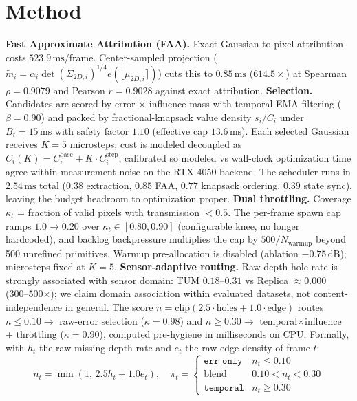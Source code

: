 \documentclass[10pt,twocolumn,letterpaper]{article}
\begin{document}
\section{Method}
\textbf{Fast Approximate Attribution (FAA).}
Exact Gaussian-to-pixel attribution costs $523.9\,\mathrm{ms}$/frame.
Center-sampled projection ($\tilde{m}_i = \alpha_i \det(\Sigma_{2D,i})^{1/4} e(\lfloor \mu_{2D,i} \rceil)$) cuts this to $\mathbf{0.85\,\mathrm{ms}}$ ($614.5\times$) at Spearman $\rho = 0.9079$ and Pearson $r = 0.9028$ against exact attribution.
\textbf{Selection.}
Candidates are scored by error $\times$ influence mass with temporal EMA filtering ($\beta = 0.90$) and packed by fractional-knapsack value density $s_i / C_i$ under $B_t = 15\,\mathrm{ms}$ with safety factor $1.10$ (effective cap $13.6\,\mathrm{ms}$).
Each selected Gaussian receives $K = 5$ microsteps; cost is modeled decoupled as $C_i(K) = C_i^{\mathrm{base}} + K \cdot C_i^{\mathrm{step}}$, calibrated so modeled vs wall-clock optimization time agree within measurement noise on the RTX 4050 backend.
The scheduler runs in $2.54\,\mathrm{ms}$ total ($0.38$ extraction, $0.85$ FAA, $0.77$ knapsack ordering, $0.39$ state sync), leaving the budget headroom to optimization proper.
\textbf{Dual throttling.}
Coverage $\kappa_t$ = fraction of valid pixels with transmission $< 0.5$.
The per-frame spawn cap ramps $1.0 \to 0.20$ over $\kappa_t \in [0.80, 0.90]$ (configurable knee, no longer hardcoded), and backlog backpressure multiplies the cap by $500/N_{\mathrm{warmup}}$ beyond 500 unrefined primitives.
Warmup pre-allocation is disabled (ablation $-0.75\,\mathrm{dB}$); microsteps fixed at $K = 5$.
\textbf{Sensor-adaptive routing.}
Raw depth hole-rate is strongly associated with sensor domain: TUM $0.18$--$0.31$ vs Replica $\approx 0.000$ (300--500$\times$); we claim domain association within evaluated datasets, not content-independence in general.
The score $n = \mathrm{clip}(2.5 \cdot \mathrm{holes} + 1.0 \cdot \mathrm{edge})$ routes $n \le 0.10 \to$ raw-error selection ($\kappa = 0.98$) and $n \ge 0.30 \to$ temporal$\times$influence + throttling ($\kappa = 0.90$), computed pre-hygiene in milliseconds on CPU.
Formally, with $h_t$ the raw missing-depth rate and $e_t$ the raw edge density of frame $t$:
{\footnotesize
\begin{equation}
n_t = \min(1,\, 2.5 h_t + 1.0 e_t), \quad
\pi_t = \begin{cases}
\texttt{err\_only} & n_t \le 0.10 \\
\text{blend} & 0.10 < n_t < 0.30 \\
\texttt{temporal} & n_t \ge 0.30
\end{cases}
\end{equation}
}
\end{document}
